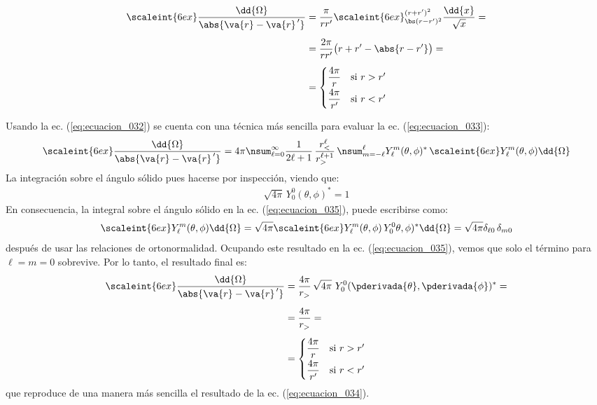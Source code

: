 \begin{align}
\begin{aligned}[b]
\scaleint{6ex} \dfrac{\dd{\Omega}}{\abs{\va{r} - \va{r}^{\, \prime}}} &= \dfrac{\pi}{r r^{\prime}} \scaleint{6ex}_{\bs (r - r^{\prime})^{2}}^{(r + r^{\prime})^{2}} \dfrac{\dd{x}}{\sqrt{x}} = \\[0.5em]
&= \dfrac{2 \pi}{r r^{\prime}} \big( r + r^{\prime} - \abs{r - r^{\prime}} \big) = \\[0.5em]
&= \begin{cases}
\dfrac{4 \pi}{r} & \mbox{si } r > r^{\prime} \\[0.5em]
\dfrac{4 \pi}{r^{\prime}} & \mbox{si } r < r^{\prime}
\end{cases}
\end{aligned}
\label{eq:ecuacion_034}
\end{align}

Usando la ec. (\ref{eq:ecuacion_032}) se cuenta con una técnica más sencilla para evaluar la ec. (\ref{eq:ecuacion_033}):
\begin{align}
\scaleint{6ex} \dfrac{\dd{\Omega}}{\abs{\va{r} - \va{r}^{\, \prime}}} = 4 \pi \nsum_{\ell=0}^{\infty} \dfrac{1}{2 \ell + 1} \, \dfrac{r_{<}^{\ell}}{r_{>}^{\ell+1}} \, \nsum_{m=-\ell}^{\ell} Y_{\ell}^{m} (\theta, \phi)^{*} \, \scaleint{6ex} Y_{\ell}^{m} (\theta, \phi) \dd{\Omega}
\label{eq:ecuacion_035}
\end{align}
La integración sobre el ángulo sólido pues hacerse por inspección, viendo que:
\begin{align}
\sqrt{4 \pi} \, Y_{0}^{0} (\theta, \phi)^{*} = 1
\end{align}
En consecuencia, la integral sobre el ángulo sólido en la ec. (\ref{eq:ecuacion_035}), puede escribirse como:
\begin{align*}
\scaleint{6ex} Y_{\ell}^{m} (\theta, \phi) \dd{\Omega} = \sqrt{4 \pi} \scaleint{6ex} Y_{\ell}^{m} (\theta, \phi) \, Y_{0}^{0} \theta, \phi)^{*} \dd{\Omega} = \sqrt{4 \pi} \delta_{\ell 0} \, \delta_{m 0}
\end{align*}
después de usar las relaciones de ortonormalidad. Ocupando este resultado en la ec. (\ref{eq:ecuacion_035}), vemos que solo el término para $\ell = m = 0$ sobrevive. Por lo tanto, el resultado final es:
\begin{align}
\begin{aligned}
\scaleint{6ex} \dfrac{\dd{\Omega}}{\abs{\va{r} - \va{r}^{\, \prime}}} &= \dfrac{4 \pi}{r_{>}} \, \sqrt{4 \pi} ~ Y_{0}^{0} (\pderivada{\theta}, \pderivada{\phi})^{*} = \\[0.5em]
&= \dfrac{4 \pi}{r_{>}} = \\[0.5em]
&= \begin{cases}
\dfrac{4 \pi}{r} & \mbox{si } r > r^{\prime} \\[0.5em]
\dfrac{4 \pi}{r^{\prime}} & \mbox{si } r < r^{\prime}
\end{cases}
\end{aligned}
\end{align}
que reproduce de una manera más sencilla el resultado de la ec. (\ref{eq:ecuacion_034}).

